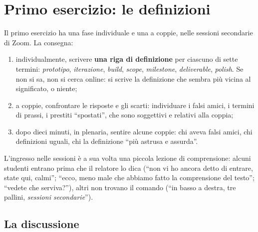 \section{Primo esercizio: le definizioni}
\label{pt:sec:es1}

Il primo esercizio ha una fase individuale e una a coppie, nelle sessioni
secondarie di Zoom. La consegna:
\begin{enumerate}
  \item individualmente, scrivere \textbf{una riga di definizione} per ciascuno
        di sette termini: \emph{prototipo}, \emph{iterazione}, \emph{build},
        \emph{scope}, \emph{milestone}, \emph{deliverable}, \emph{polish}. Se non
        si sa, non si cerca online: si scrive la definizione che sembra più
        vicina al significato, o niente;
  \item a coppie, confrontare le risposte e gli scarti: individuare i falsi
        amici, i termini di prassi, i prestiti ``spostati'', che sono
        soggettivi e relativi alla coppia;
  \item dopo dieci minuti, in plenaria, sentire alcune coppie: chi aveva falsi
        amici, chi definizioni uguali, chi la definizione ``più astrusa e
        assurda''.
\end{enumerate}
L'ingresso nelle sessioni è a sua volta una piccola lezione di comprensione:
alcuni studenti entrano prima che il relatore lo dica (``non vi ho ancora detto
di entrare, state qui, calmi''; ``ecco, meno male che abbiamo fatto la
comprensione del testo''; ``vedete che serviva?''), altri non trovano il
comando (``in basso a destra, tre pallini, \emph{sessioni secondarie}'').

\subsection{La discussione}

